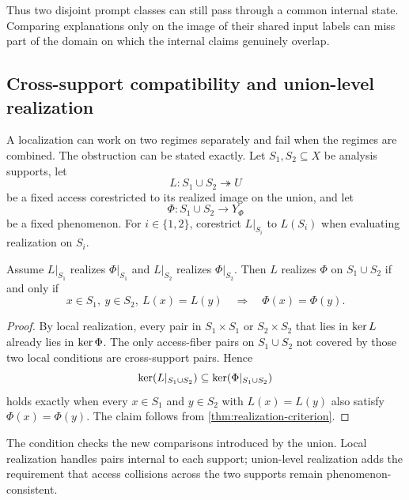 Thus two disjoint prompt classes can still pass through a common internal state. Comparing explanations only on the image of their shared input labels can miss part of the domain on which the internal claims genuinely overlap.

\subsection{Cross-support compatibility and union-level realization}

A localization can work on two regimes separately and fail when the regimes are combined. The obstruction can be stated exactly. Let $S_1,S_2\subseteq X$ be analysis supports, let
\[
L:S_1\cup S_2\twoheadrightarrow U
\]
be a fixed access corestricted to its realized image on the union, and let
\[
\Phi:S_1\cup S_2\to Y_\Phi
\]
be a fixed phenomenon. For $i\in\{1,2\}$, corestrict $L|_{S_i}$ to $L(S_i)$ when evaluating realization on $S_i$.

\begin{proposition}
\label{prop:cross-support-compatibility}
Assume $L|_{S_1}$ realizes $\Phi|_{S_1}$ and $L|_{S_2}$ realizes $\Phi|_{S_2}$. Then $L$ realizes $\Phi$ on $S_1\cup S_2$ if and only if
\begin{equation}
x\in S_1,\ y\in S_2,\ L(x)=L(y)
\quad\Longrightarrow\quad
\Phi(x)=\Phi(y).
\label{eq:cross-support-compatibility}
\end{equation}
\end{proposition}

\begin{proof}
By local realization, every pair in $S_1\times S_1$ or $S_2\times S_2$ that lies in $\operatorname{ker} L$ already lies in $\operatorname{ker}\Phi$. The only access-fiber pairs on $S_1\cup S_2$ not covered by those two local conditions are cross-support pairs. Hence
\[
\operatorname{ker}(L|_{S_1\cup S_2})
\subseteq
\operatorname{ker}(\Phi|_{S_1\cup S_2})
\]
holds exactly when every $x\in S_1$ and $y\in S_2$ with $L(x)=L(y)$ also satisfy $\Phi(x)=\Phi(y)$. The claim follows from \cref{thm:realization-criterion}.
\end{proof}

The condition checks the new comparisons introduced by the union. Local realization handles pairs internal to each support; union-level realization adds the requirement that access collisions across the two supports remain phenomenon-consistent.

